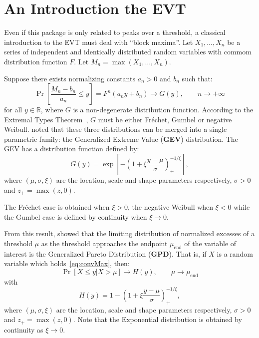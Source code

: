 \documentclass[11pt,a4paper]{article}
\numberwithin{equation}{section}
\begin{document}
\section{An Introduction the EVT}
\label{sec:introEVT}

Even if this package is only related to peaks over a threshold, a
classical introduction to the EVT must deal with ``block maxima''. Let
$X_1,\ldots,X_n$ be a series of independent and identically distributed
random variables with commom distribution function $F$. Let $M_n =
\max(X_1,\ldots,X_n)$.

Suppose there exists normalizing constants $a_n>0$ and $b_n$ such
that:
\begin{equation}
  \label{eq:convMax}
  \Pr\left[\frac{M_n - b_n}{a_n} \leq y \right] = F^n(a_ny+b_n)
  \longrightarrow G(y), \qquad n \rightarrow +\infty
\end{equation}
for all $y \in \mathbb{R}$, where $G$ is a non-degenerate distribution
function. According to the Extremal Types Theorem~\citep{Fisher1928},
$G$ must be either Fr\'echet, Gumbel or negative
Weibull. \citet{Jenkinson1955} noted that these three distributions can
be merged into a single parametric family: the Generalized Extreme
Value (\textbf{GEV}) distribution. The GEV has a distribution function
defined by:
\begin{equation}
  \label{eq:GEV}
  G(y) = \exp\left[ -\left( 1 + \xi \frac{y-\mu}{\sigma} \right)_+^{-1/\xi} \right], 
\end{equation}
where $(\mu,\sigma,\xi)$ are the location, scale and shape parameters
respectively, $\sigma>0$ and $z_+=\max(z,0)$.

The Fr\'echet case is obtained when $\xi>0$, the negative Weibull when
$\xi<0$ while the Gumbel case is defined by continuity when
$\xi\rightarrow0$.

From this result, \citet{Pickands1975} showed that the limiting
distribution of normalized excesses of a threshold $\mu$ as the
threshold approaches the endpoint $\mu_\mathrm{end}$ of the variable
of interest is the Generalized Pareto Distribution
(\textbf{GPD}). That is, if $X$ is a random variable which
holds~\eqref{eq:convMax}, then:
\begin{equation}
  \label{eq:convExcess}
  \Pr\left[X \leq y | X > \mu \right] \longrightarrow H(y), \qquad \mu
    \rightarrow \mu_\mathrm{end}
\end{equation}
with
\begin{equation}
  \label{eq:GPD}
  H(y) = 1 - \left(1 + \xi\frac{y-\mu}{\sigma}\right)_+^{-1/\xi},
\end{equation}
where $(\mu,\sigma,\xi)$ are the location, scale and shape parameters
respectively, $\sigma>0$ and $z_+=\max(z,0)$. Note that the
Exponential distribution is obtained by continuity as $\xi \rightarrow
0$.
\end{document}

